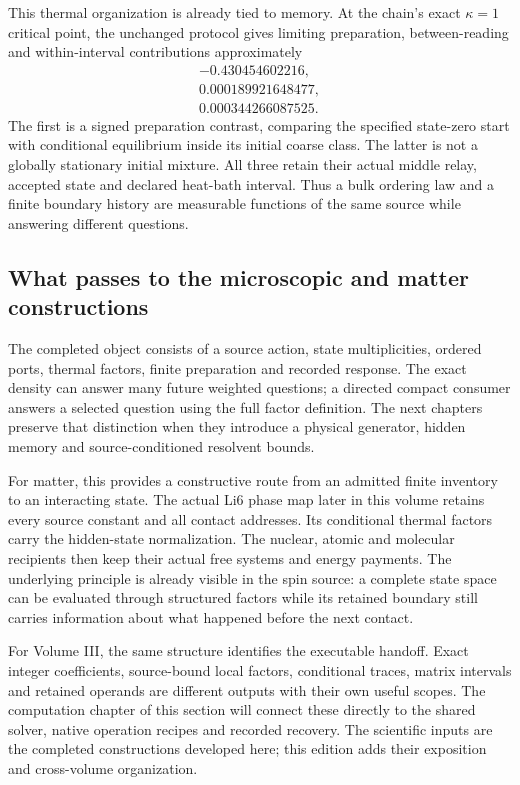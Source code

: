 This thermal organization is already tied to memory. At the chain's exact $\kappa=1$ critical point, the unchanged protocol gives limiting preparation, between-reading and within-interval contributions approximately
\begin{equation}
\begin{gathered}
-0.430454602216,\\
0.000189921648477,\\
0.000344266087525.
\end{gathered}
\end{equation}
The first is a signed preparation contrast, comparing the specified state-zero start with conditional equilibrium inside its initial coarse class. The latter is not a globally stationary initial mixture. All three retain their actual middle relay, accepted state and declared heat-bath interval. Thus a bulk ordering law and a finite boundary history are measurable functions of the same source while answering different questions.

\subsection{What passes to the microscopic and matter constructions}

The completed object consists of a source action, state multiplicities, ordered ports, thermal factors, finite preparation and recorded response. The exact density can answer many future weighted questions; a directed compact consumer answers a selected question using the full factor definition. The next chapters preserve that distinction when they introduce a physical generator, hidden memory and source-conditioned resolvent bounds.

For matter, this provides a constructive route from an admitted finite inventory to an interacting state. The actual Li6 phase map later in this volume retains every source constant and all contact addresses. Its conditional thermal factors carry the hidden-state normalization. The nuclear, atomic and molecular recipients then keep their actual free systems and energy payments. The underlying principle is already visible in the spin source: a complete state space can be evaluated through structured factors while its retained boundary still carries information about what happened before the next contact.

For Volume III, the same structure identifies the executable handoff. Exact integer coefficients, source-bound local factors, conditional traces, matrix intervals and retained operands are different outputs with their own useful scopes. The computation chapter of this section will connect these directly to the shared solver, native operation recipes and recorded recovery. The scientific inputs are the completed constructions developed here; this edition adds their exposition and cross-volume organization.
